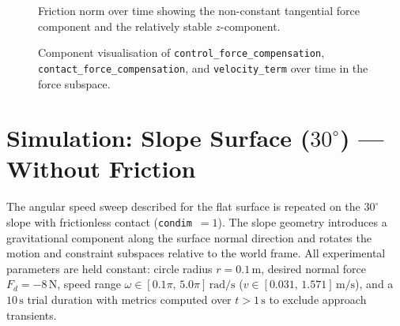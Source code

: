 \documentclass[
	german,%
	accentcolor=9c,%
	ruledheaders=section,%
	class=report,%
	thesis={type=bachelor},%
	fontsize=11pt,%
	parskip=half-,%
	custommargins=true,%
	marginpar=false,%
]{tudapub}
\begin{document}
\begin{figure}[htbp]
    \centering
    \caption{Friction norm over time showing the non-constant tangential
             force component and the relatively stable $z$-component.}
    \label{fig:friction_norm}
\end{figure}




\begin{figure}[htbp]
    \centering
    \caption{Component visualisation of \texttt{control\_force\_compensation},
             \texttt{contact\_force\_compensation}, and \texttt{velocity\_term}
             over time in the force subspace.}
    \label{fig:compensation_components}
\end{figure}


\section{Simulation: Slope Surface (\texorpdfstring{$30^\circ$}{30 deg}) --- Without Friction}

The angular speed sweep described for the flat surface is repeated on the
$30^\circ$ slope with frictionless contact (\texttt{condim}~$= 1$).
The slope geometry introduces a gravitational component along the surface
normal direction and rotates the motion and constraint subspaces relative to
the world frame.
All experimental parameters are held constant: circle radius $r = 0.1\,\mathrm{m}$,
desired normal force $F_d = -8\,\mathrm{N}$, speed range
$\omega \in [0.1\pi,\,5.0\pi]\,\mathrm{rad/s}$
($v \in [0.031,\,1.571]\,\mathrm{m/s}$),
and a $10\,\mathrm{s}$ trial duration with metrics computed over
$t > 1\,\mathrm{s}$ to exclude approach transients.
\end{document}
